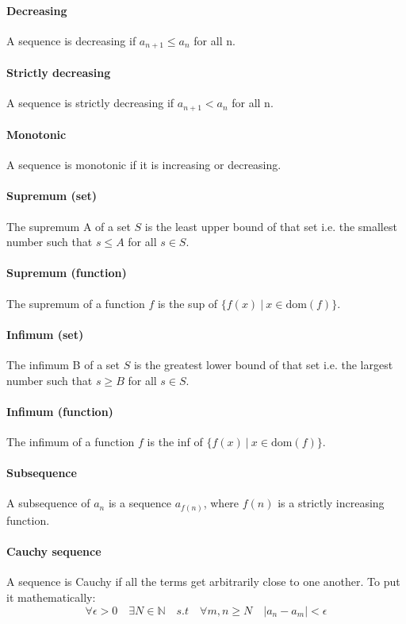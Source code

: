 \documentclass{scrartcl}
\newcommand{\N}{\mathbb{N}}
\begin{document}
\paragraph{Decreasing}
A sequence is decreasing if $ a_{n + 1} \leq a_{n} $ for all n.
\paragraph{Strictly decreasing}
A sequence is strictly decreasing if $ a_{n + 1} < a_{n} $ for all n.
\paragraph{Monotonic}
A sequence is monotonic if it is increasing or decreasing.
\paragraph{Supremum (set)}
The supremum A of a set $ S $ is the least upper bound of that set i.e. the smallest number such that $ s \leq A $ for all $ s \in S $.
\paragraph{Supremum (function)}
The supremum of a function $ f $ is the sup of $ \{f(x) \ | \ x \in \textrm{dom}(f)\} $.
\paragraph{Infimum (set)}
The infimum B of a set $ S $ is the greatest lower bound of that set i.e. the largest number such that $ s \geq B $ for all $ s \in S $.
\paragraph{Infimum (function)}
The infimum of a function $ f $ is the inf of $ \{f(x) \ | \ x \in \textrm{dom}(f)\} $.
\paragraph{Subsequence}
A subsequence of $ a_{n} $ is a sequence $ a_{f(n)} $, where $ f(n) $ is a strictly increasing function.
\paragraph{Cauchy sequence}
A sequence is Cauchy if all the terms get arbitrarily close to one another. To put it mathematically:
\begin{equation}
\forall \epsilon > 0 \quad \exists N \in \N \quad s.t \quad \forall m,n \geq N \quad |a_{n} - a_{m}| < \epsilon
\end{equation}
\end{document}
